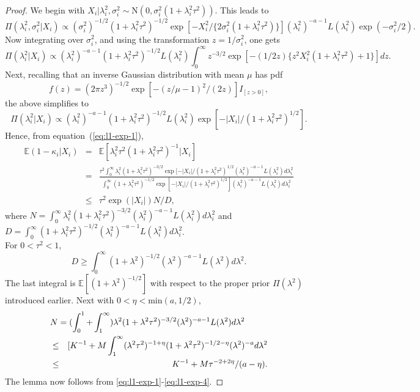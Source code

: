 \documentclass[sn-basic]{sn-jnl}%
\theoremstyle{thmstyleone}%
\begin{document}
\begin{proof}
We begin with $X_i|\lambda_i^2,\sigma_i^2\sim\mbox{N}(0,\sigma_i^2
(1+\lambda_i^2\tau^2))$. This leads to
\[
\Pi(\lambda_i^2,\sigma_i^2|X_i)\propto(\sigma_i^2)^{-1/2}(1+\lambda_i^2\tau^2)
^{-1/2}\exp[-X_i^2/\{2\sigma_i^2(1+\lambda_i^2\tau^2)\}](\lambda_i^2)^{-a-1}
L(\lambda_i^2)\exp(-\sigma_i^2/2).
\]
Now integrating over $\sigma_i^2$, and using the transformation 
$z=1/\sigma_i^2$, one gets
\[
\Pi(\lambda_i^2|X_i)\propto(\lambda_i^2)^{-a-1}(1+\lambda_i^2\tau^2)^{-1/2}
L(\lambda_i^2)\int_{0}^{\infty}z^{-3/2}\exp[-(1/2z)\{z^2X_i^2(1+\lambda_i^2\tau^2)+1\}]dz.
\]
Next, recalling that an inverse Gaussian distribution with mean $\mu$ has pdf
\[
f(z)=(2\pi z^3)^{-1/2}\exp[-(z/\mu-1)^2/(2z)]I_{[z>0]},
\]
the above simplifies to
\begin{equation}
\Pi(\lambda_i^2|X_i)\propto(\lambda_i^2)^{-a-1}(1+\lambda_i^2\tau^2)^{-1/2}
L(\lambda_i^2)\exp[-|X_i|/(1+\lambda_i^2\tau^2)^{1/2}].
\label{eq:l1-exp-1}
\end{equation}
Hence, from equation~(\ref{eq:l1-exp-1}),
\begin{eqnarray}
\mathbb{E}(1-\kappa_i|X_i) & = & \mathbb{E}[\lambda_i^2\tau^2(1+\lambda_i^2\tau^2)^{-1}|X_i]
\nonumber\\ & = & \frac{\tau^2\int_{0}^{\infty}\lambda_i^2
(1+\lambda_i^2\tau^2)^{-3/2}\exp[-|X_i|/(1+\lambda_i^2\tau^2)^{1/2}
(\lambda_i^2)^{-a-1}L(\lambda_i^2)d\lambda_i^2}
{\int_{0}^{\infty}(1+\lambda_i^2\tau^2)^{-1/2}
\exp[-|X_i|/(1+\lambda_i^2\tau^2)^{1/2}](\lambda_i^2)^{-a-1}
L(\lambda_i^2)d\lambda_i^2}\nonumber\\ & \leq & \tau^2\exp(|X_i|)N/D,
\label{eq:l1-exp-2}
\end{eqnarray}
where $N=\int_{0}^{\infty}\lambda_i^2(1+\lambda_i^2\tau^2)^{-3/2}
(\lambda_i^2)^{-a-1}L(\lambda_i^2)d\lambda_i^2$ and 
$D=\int_{0}^{\infty}(1+\lambda_i^2\tau^2)^{-1/2}(\lambda_i^2)^{-a-1}
L(\lambda_i^2)d\lambda_i^2$.\\

\noindent
For $0<\tau^2<1$, 
\begin{equation}
D\geq \int_0^\infty (1+\lambda^2)^{-1/2}(\lambda^2)^{-a-1}L(\lambda^2)d\lambda^2.
\label{eq:l1-exp-3}
\end{equation}
The last integral is $\mathbb{E}[(1+\lambda^2)^{-1/2}]$ with respect to the proper
prior $\Pi(\lambda^2)$ introduced earlier. 
Next with $0<\eta<\mbox{min}(a,1/2)$,
\begin{eqnarray}
\lefteqn{ N=(\int_{0}^{1} +\int_{1}^{\infty})\lambda^2
(1+\lambda^2\tau^2)^{-3/2}(\lambda^2)^{-a-1}L(\lambda^2)d\lambda^2}\nonumber\\
 & \leq & [K^{-1}+M\int_{1}^{\infty}(\lambda^2\tau^2)^{-1+\eta}
(1+\lambda^2\tau^2)^{-1/2-\eta}(\lambda^2)^{-a}d\lambda^2\nonumber\\
 & \leq & 
K^{-1}+M\tau^{-2+2\eta}/(a-\eta).
\label{eq:l1-exp-4}
\end{eqnarray}
The lemma now follows from \eqref{eq:l1-exp-1}-\eqref{eq:l1-exp-4}.
\end{proof}
\end{document}
